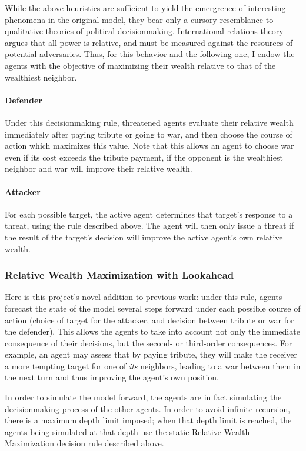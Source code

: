 \documentclass{article}
\begin{document}
While the above heuristics are sufficient to yield the emergrence of interesting phenomena in the original model, they bear only a cursory resemblance to qualitative theories of political decisionmaking. International relations theory argues that all power is relative, and must be measured against the resources of potential adversaries. Thus, for this behavior and the following one, I endow the agents with the objective of maximizing their wealth relative to that of the wealthiest neighbor. 

\paragraph{Defender}
Under this decisionmaking rule, threatened agents evaluate their relative wealth immediately after paying tribute or going to war, and then choose the course of action which maximizes this value. Note that this allows an agent to choose war even if its cost exceeds the tribute payment, if the opponent is the wealthiest neighbor and war will improve their relative wealth.

\paragraph{Attacker}
For each possible target, the active agent determines that target's response to a threat, using the rule described above. The agent will then only issue a threat if the result of the target's decision will improve the active agent's own relative wealth.

\subsubsection{Relative Wealth Maximization with Lookahead}

Here is this project's novel addition to previous work: under this rule, agents forecast the state of the model several steps forward under each possible course of action (choice of target for the attacker, and decision between tribute or war for the defender). This allows the agents to take into account not only the immediate consequence of their decisions, but the second- or third-order consequences. For example, an agent may assess that by paying tribute, they will make the receiver a more tempting target for one of \emph{its} neighbors, leading to a war between them in the next turn and thus improving the agent's own position.

In order to simulate the model forward, the agents are in fact simulating the decisionmaking process of the other agents. In order to avoid infinite recursion, there is a maximum depth limit imposed; when that depth limit is reached, the agents being simulated at that depth use the static Relative Wealth Maximization decision rule described above.
\end{document}
